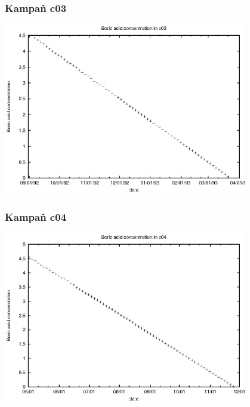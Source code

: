 \documentclass[a4paper,twoside,11pt]{article}
\begin{document}
\subsubsection{Kampaň c03}
\begin{center}
\includegraphics[width=0.8\textwidth]{bc_c03.eps}
\end{center}




\subsubsection{Kampaň c04}
\begin{center}
\includegraphics[width=0.8\textwidth]{bc_c04.eps}
\end{center}
\end{document}
